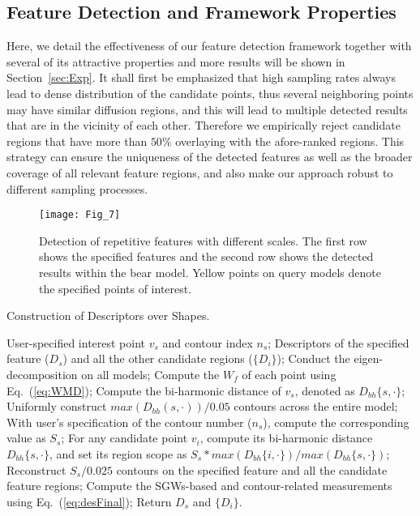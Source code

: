 \subsection{Feature Detection and Framework Properties}

Here, we detail the effectiveness of our feature detection framework
together with several of its attractive properties and more results
will be shown in Section~\ref{sec:Exp}. It shall first be emphasized
that high sampling rates always lead to dense distribution of the
candidate points, thus several neighboring points may have similar
diffusion regions, and this will lead to multiple detected results
that are in the vicinity of each other. Therefore we empirically
reject candidate regions that have more than $50\%$ overlaying with
the afore-ranked regions. This strategy can ensure the uniqueness of
the detected features as well as the broader coverage of all relevant
feature regions, and also make our approach robust to different
sampling processes.

\begin{figure}[!to]
\texttt{[image: Fig\_7]}
\caption[Detection of repetitive features with different scales.]
  {Detection of repetitive features with different scales. The
  first row shows the specified features and the second row shows the
  detected results within the bear model. Yellow points on query
  models denote the specified points of interest.}
\label{scales}
\end{figure}


\begin{algorithm}
\caption{Construction of Descriptors over Shapes.}
\label{alg:Framwork}
\begin{algorithmic}[1]
\REQUIRE User-specified interest point $v_{s}$ and contour index $n_{s}$;
\ENSURE  Descriptors of the specified feature ($D_{s}$) and all
         the other candidate regions ($\{D_{i}\}$);
\STATE Conduct the eigen-decomposition on all models;
\STATE Compute the $W_f$ of each point using Eq.~(\ref{eq:WMD});
\STATE Compute the bi-harmonic distance of $v_{s}$, denoted as $D_{bh}\{s,\cdot\}$;
\STATE Uniformly construct  $max(D_{bh}(s,\cdot))/0.05$ contours across the entire model;
\STATE With user's specification of the contour number ($n_{s}$), compute the corresponding value as $S_{s}$;
\STATE For any candidate point $v_{i}$, compute its bi-harmonic distance $D_{bh}\{s,\cdot\}$,
       and set its region scope as $S_{s}*max(D_{bh}\{i,\cdot\})/max(D_{bh}\{s,\cdot\})$;
\STATE Reconstruct $S_{s}/0.025$ contours on the specified feature and all the candidate feature regions;
\STATE Compute the SGWs-based and contour-related measurements using Eq.~(\ref{eq:desFinal});
\STATE Return $D_s$ and $\{D_{i}\}$.
\end{algorithmic}
\end{algorithm}

